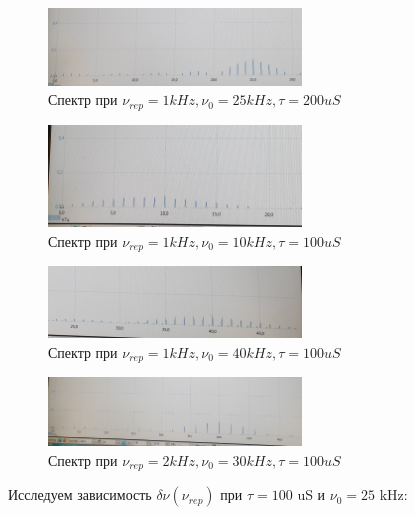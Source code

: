 \documentclass{article}
\begin{document}
\begin{figure}[H]
    \centering
    \includegraphics[width=0.6\textwidth]{cug_2.jpg}
    \caption{Спектр при \( \nu_{rep} = 1kHz, \nu_0 = 25 kHz, \tau = 200uS \)} 
    \label{spec_cug_2}
\end{figure}

\begin{figure}[H]
    \centering
    \includegraphics[width=0.6\textwidth]{cug_3.jpg}
    \caption{Спектр при \( \nu_{rep} = 1kHz, \nu_0 = 10 kHz, \tau = 100uS \)} 
    \label{spec_cug_2}
\end{figure}

\begin{figure}[H]
    \centering
    \includegraphics[width=0.6\textwidth]{cug_4.jpg}
    \caption{Спектр при \( \nu_{rep} = 1kHz, \nu_0 = 40 kHz, \tau = 100uS \)} 
    \label{spec_cug_2}
\end{figure}

\begin{figure}[H]
    \centering
    \includegraphics[width=0.6\textwidth]{cug_5.jpg}
    \caption{Спектр при \( \nu_{rep} = 2kHz, \nu_0 = 30 kHz, \tau = 100uS \)}
    \label{spec_cug_1}
\end{figure}

Исследуем зависимость \( \delta\nu (\nu_{rep}) \) при \( \tau = 100\) uS  и \(\nu_0 = 25\) kHz:
\end{document}
